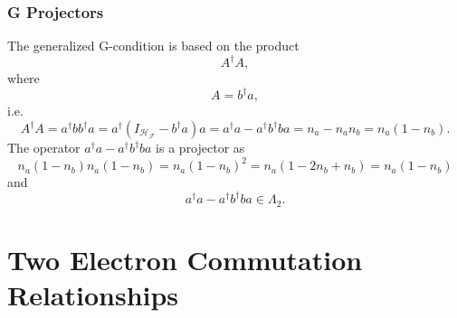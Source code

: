 \documentclass[aps,preprint]{revtex4}%
\begin{document}
\subsubsection{G Projectors}

The generalized G-condition is based on the product
\begin{equation}
A^{\dagger}A,
\end{equation}
where
\begin{equation}
A=b^{\dagger}a,
\end{equation}
i.e.%
\begin{equation}
A^{\dagger}A=a^{\dagger}bb^{\dagger}a=a^{\dagger}\left(  I_{\mathcal{H}%
_{\mathcal{F}}}-b^{\dagger}a\right)  a=a^{\dagger}a-a^{\dagger}b^{\dagger
}ba=n_{a}-n_{a}n_{b}=n_{a}\left(  1-n_{b}\right)  .
\end{equation}
The operator $a^{\dagger}a-a^{\dagger}b^{\dagger}ba$ is a projector as
\begin{equation}
n_{a}\left(  1-n_{b}\right)  n_{a}\left(  1-n_{b}\right)  =n_{a}\left(
1-n_{b}\right)  ^{2}=n_{a}\left(  1-2n_{b}+n_{b}\right)  =n_{a}\left(
1-n_{b}\right)
\end{equation}
and
\begin{equation}
a^{\dagger}a-a^{\dagger}b^{\dagger}ba\in\Lambda_{2}.
\end{equation}


\section{Two Electron Commutation Relationships
\label{Commutation Relationship}}
\end{document}

